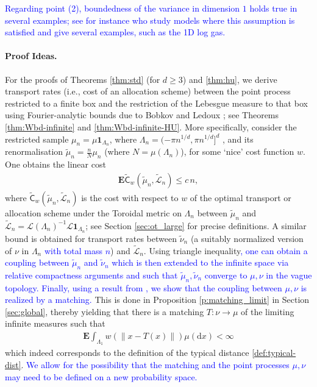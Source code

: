 \documentclass[12pt]{article}
\newcommand{\Leb}{\mathcal{L}}
\newcommand{\tLeb}{\tilde{\mathcal{L}}}
\newcommand{\1}{\mathbf{1}}
\newcommand{\md}{\mathrm{d}}
\newcommand{\tmu}{\tilde{\mu}}
\newcommand{\RL}[1]{\textcolor{blue}{#1}}
\newcommand{\dy}[1]{\textcolor{blue}{#1}}
\newcommand{\RL}[1]{#1}%
\newcommand{\dy}[1]{#1}%
\begin{document}
{{{\RL{ Regarding point (2), boundedness of the variance in dimension $ 1$ holds true in several examples; see for instance  \cite{AGL} who study models where this assumption is satisfied and give several examples, such as the 1D log gas.}

\paragraph{{Proof Ideas.}} For the proofs of Theorems  \ref{thm:std} (for $d \geq 3$) and \ref{thm:hu}, we derive transport rates ({i.e., cost of an allocation scheme}) between the point process restricted to a finite box and the restriction of the Lebesgue measure to that box using Fourier-analytic bounds due to Bobkov and Ledoux \cite{bobkov2021simple}; see Theorems \ref{thm:Wbd-infinite} and \ref{thm:Wbd-infinite-HU}. More specifically, consider the restricted sample $ \mu_{n}= \mu\1_{\Lambda _{n}}$, where $ \Lambda _{n} = (-\pi n^{1/d} ,\pi n^{1/d}]^{d} $ , and its renormalisation $ \tilde \mu _{n}= \frac{ n}{N}\mu _{n}$ (where $ N = \mu (\Lambda _{n})$),  for some `nice'  cost function $ w$. One obtains the linear cost
%
\begin{align*}
\mathbf{E} \widetilde{\mathsf C } _{w}(\tilde \mu _{n},\tLeb_{n}) \leqslant c \, n,
\end{align*}
%
 {where $\widetilde{\mathsf C } _{w}(\tilde \mu _{n},\tLeb_{n})$ is the cost with respect to $w$ of the
optimal {transport or allocation scheme} under the Toroidal metric on $\Lambda_n$ between $\tmu_n$ and $\tLeb_{n} = \Leb(\Lambda _{ n})^{ -1}\Leb\1_{ \Lambda _{ n}}$; %
see Section
\ref{sec:ot_large} for precise definitions. A similar bound is obtained for transport rates between $\tilde \nu_n$ (a suitably normalized version of $\nu$ in $\Lambda_n$ \dy{with total mass $n$}) and $\tLeb_n$. Using triangle inequality\dy{, one can obtain a coupling between $\tilde \mu _{n}$ and $\tilde \nu_n$ which is then extended to the infinite space via relative compactness arguments and such that $\tmu_n, \tilde \nu_n$ converge to $\mu,\nu$ in the vague topology. Finally, using a result from \cite{erbar2023optimal}, we show that the coupling between $\mu,\nu$ is realized by a matching.} This is done in Proposition \ref{p:matching_limit} in Section \ref{sec:global}, thereby yielding that there is a matching $ T:\nu \to \mu $  {of the limiting infinite measures}  such that
\begin{align*}
\mathbf{E}\int_{\Lambda _{1}}w(\|x-T(x)\|)\mu (\md x)<\infty
\end{align*}
which indeed corresponds to the definition of the typical distance  \eqref{def:typical-dist}.}  \dy{We allow for the possibility that the matching and the point processes $\mu,\nu$ may need to be defined on a new probability space.}

}}}
\end{document}
